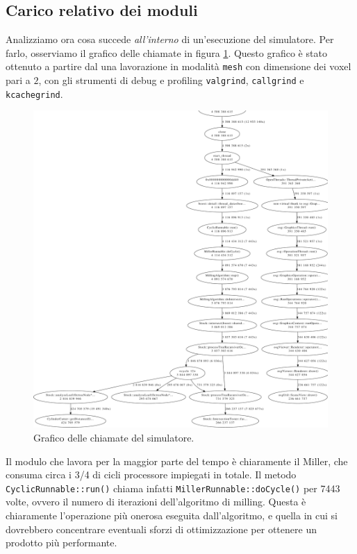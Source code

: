 \subsection{Carico relativo dei moduli}
Analizziamo ora cosa succede \textit{all'interno} di un'esecuzione del simulatore. Per farlo, osserviamo il grafico delle chiamate in figura \ref{fig:callgraph}. Questo grafico è stato ottenuto a partire dal una lavorazione in modalità \texttt{mesh} con dimensione dei voxel pari a $2$, con gli strumenti di debug e profiling \texttt{valgrind}, \texttt{callgrind} e \texttt{kcachegrind}.

\begin{figure}[htp]
	\centering
	\includegraphics[width=.97\textwidth]{./img/callgraph.pdf}
	\caption{Grafico delle chiamate del simulatore.}
	\label{fig:callgraph}
\end{figure}

Il modulo che lavora per la maggior parte del tempo è chiaramente il Miller, che consuma circa i 3/4 di cicli processore impiegati in totale. Il metodo \texttt{CyclicRunnable::run()} chiama infatti \texttt{MillerRunnable::doCycle()} per 7443 volte, ovvero il numero di iterazioni dell'algoritmo di milling. Questa è chiaramente l'operazione più onerosa eseguita dall'algoritmo, e quella in cui si dovrebbero concentrare eventuali sforzi di ottimizzazione per ottenere un prodotto più performante.

